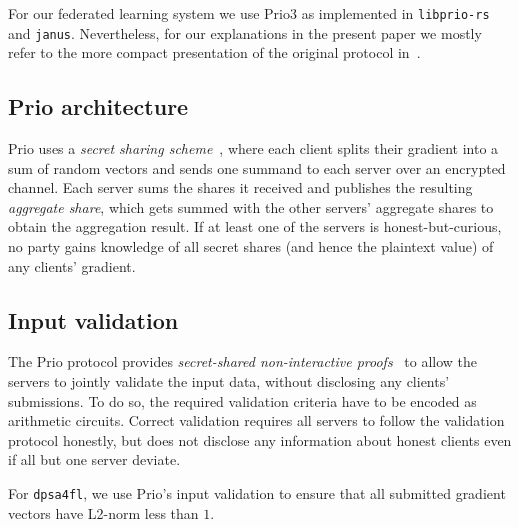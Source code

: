 \documentclass{article}
\begin{document}
For our federated learning system we use Prio3
as implemented in \texttt{libprio-rs} and \texttt{janus}. Nevertheless, for our
explanations in the present paper
we mostly refer to the more compact presentation of the original protocol in~\cite{prio}.

\subsection{Prio architecture}
Prio uses a \textit{secret sharing scheme}~\cite[Step 1 of scheme on page
3]{prio}, where each client splits their gradient into a sum of random vectors
and sends one summand to each server over an encrypted channel. Each server
sums the shares it received and publishes the resulting \textit{aggregate
  share}, which gets summed with the other servers' aggregate shares to obtain
the aggregation result. If at least one of the servers is honest-but-curious,
no party gains knowledge of all secret shares (and hence the plaintext value)
of any clients' gradient.

\subsection{Input validation}
The Prio protocol provides \textit{secret-shared non-interactive
  proofs}~\cite[Section 4]{prio} to allow the servers to jointly validate
the input data, without disclosing any clients' submissions. To do so, the
required validation criteria have to be encoded as arithmetic circuits.
Correct validation requires all servers to follow the validation protocol
honestly, but does not disclose any information about honest clients even if all
but one server deviate.

For \texttt{dpsa4fl}, we use Prio's input validation to ensure that all
submitted gradient vectors have L2-norm less than $1$.


%
\end{document}
